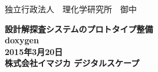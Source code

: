 \documentclass[a4paper,10pt,oneside]{jsbook}
\begin{document}
\begin{titlepage}
\noindent
独立行政法人　理化学研究所　御中
\begin{center}
	\vspace{8cm}
	{\Huge \textbf{設計解探査システムのプロトタイプ整備} } \\
	\vspace{1cm}
	{\Huge \textbf{doxygen}} \\
	\vspace{10cm}
	{\Large \textbf{2015年3月20日}} \\
	\vspace{0.5cm}
	{\Large \textbf{株式会社イマジカ デジタルスケープ}}
\end{center}
\end{titlepage}
\end{document}
